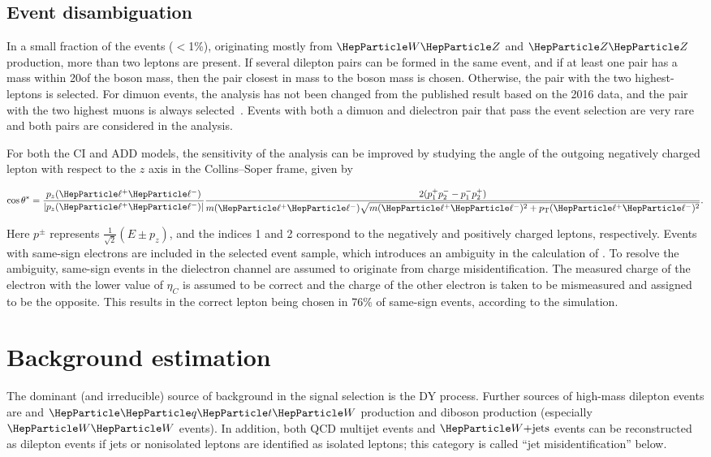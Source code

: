 \documentclass[11pt,twoside,a4paper,cmspaper,final,collab]{cms-tdr}
\begin{document}
\subsection{Event disambiguation}

In a small fraction of the events ($<$1\%), originating mostly from $\PW\PZ$ and $\PZ\PZ$ production, more than two leptons are present. If several dilepton pairs can be formed in the same event, and if at least one pair has a mass within 20\GeV of the \PZ boson mass, then the pair closest in mass to  the \PZ boson mass is chosen. Otherwise, the pair with the two highest-\pt leptons is selected.
For dimuon events, the analysis has not been changed from the published result based on the 2016 data, and the pair with the two highest \pt muons is always selected~\cite{Sirunyan:2018exx}. Events with both a dimuon and dielectron pair that pass the event selection are very rare and both pairs are considered in the analysis.

For both the CI and ADD models, the sensitivity of the analysis can be improved by studying the angle of the outgoing negatively 
charged lepton with respect to the $z$ axis in the Collins--Soper frame, given by
\begin{linenomath}
\begin{equation}
 \label{eq:ci-CS}
 \costheta = \frac{p_z(\Pell^+\Pell^-)}{\abs{p_z(\Pell^+\Pell^-)}}\frac{2(p_1^+p_2^--p_1^-p_2^+)}{m(\Pell^+\Pell^-)\sqrt{m(\Pell^+\Pell^-)^2+\pt(\Pell^+\Pell^-)^2}}.
\end{equation}
\end{linenomath} 
Here $p^{\pm}$ represents $\frac{1}{\sqrt{2}}(E\pm{p_z})$, and the indices 1 and 2
correspond to the negatively and positively charged leptons,
respectively. Events with same-sign electrons are included in the selected event sample, which introduces an ambiguity in the calculation of \costheta. To resolve the ambiguity, same-sign events in the dielectron channel are assumed to originate from charge misidentification. The measured charge of the electron with the lower value of $\eta_C$ is assumed to be correct and the charge of the other electron is taken to be mismeasured and assigned to be the opposite. This results in the correct lepton being chosen in 76\% of same-sign events, according to the simulation.

\section{Background estimation}
\label{sec:backgrounds}
The dominant (and irreducible) source of background in the signal selection is the DY process. Further sources of high-mass dilepton events are \ttbar and $\PQqt\PW$ production and diboson production (especially $\PW\PW$ events).  In addition, both QCD multijet events and $\PW\text{+jets}$ events can be reconstructed as dilepton events if jets or nonisolated leptons are identified as isolated leptons; this category is called ``jet misidentification'' below.
\end{document}
